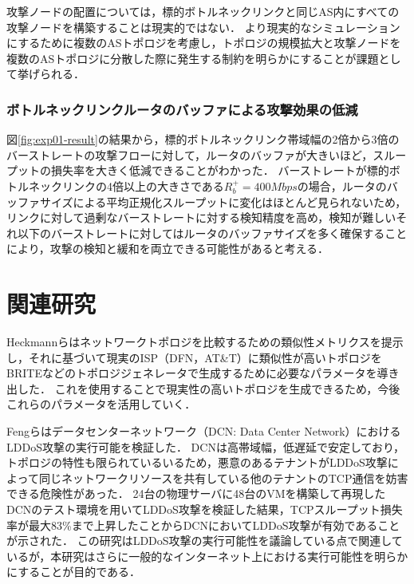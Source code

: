 \documentclass[Japanese]{dicomopapers}
\begin{document}
攻撃ノードの配置については，標的ボトルネックリンクと同じAS内にすべての攻撃ノードを構築することは現実的ではない．
より現実的なシミュレーションにするために複数のASトポロジを考慮し，トポロジの規模拡大と攻撃ノードを複数のASトポロジに分散した際に発生する制約を明らかにすることが課題として挙げられる．

\subsubsection{ボトルネックリンクルータのバッファによる攻撃効果の低減}
図\ref{fig:exp01-result}の結果から，標的ボトルネックリンク帯域幅の2倍から3倍のバーストレートの攻撃フローに対して，ルータのバッファが大きいほど，スループットの損失率を大きく低減できることがわかった．
バーストレートが標的ボトルネックリンクの4倍以上の大きさである$R_{b}^+=400Mbps$の場合，ルータのバッファサイズによる平均正規化スループットに変化はほとんど見られないため，リンクに対して過剰なバーストレートに対する検知精度を高め，検知が難しいそれ以下のバーストレートに対してはルータのバッファサイズを多く確保することにより，攻撃の検知と緩和を両立できる可能性があると考える．

\section{関連研究}
Heckmannらはネットワークトポロジを比較するための類似性メトリクスを提示し，それに基づいて現実のISP（DFN，AT\&T）に類似性が高いトポロジをBRITEなどのトポロジジェネレータで生成するために必要なパラメータを導き出した\cite{realistic-topologies}．
これを使用することで現実性の高いトポロジを生成できるため，今後これらのパラメータを活用していく．

Fengらはデータセンターネットワーク（DCN: Data Center Network）におけるLDDoS攻撃の実行可能を検証した\cite{dcn-shrew}．
DCNは高帯域幅，低遅延で安定しており，トポロジの特性も限られているいるため，悪意のあるテナントがLDDoS攻撃によって同じネットワークリソースを共有している他のテナントのTCP通信を妨害できる危険性があった．
24台の物理サーバに48台のVMを構築して再現したDCNのテスト環境を用いてLDDoS攻撃を検証した結果，TCPスループット損失率が最大83\%まで上昇したことからDCNにおいてLDDoS攻撃が有効であることが示された．
この研究はLDDoS攻撃の実行可能性を議論している点で関連しているが，本研究はさらに一般的なインターネット上における実行可能性を明らかにすることが目的である．
\end{document}
